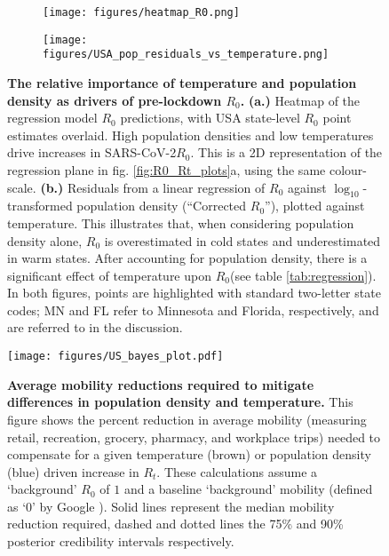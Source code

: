 \documentclass[12pt,english,a4paper]{article}
\newcommand{\virus}{SARS-CoV-2\xspace}
\newcommand{\RO}{$R_0$\xspace}
\begin{document}
\begin{figure}[ht]
\begin{subfigure}{.5\textwidth}
  \centering
  \texttt{[image: figures/heatmap\_R0.png]}  
  \caption{}
\end{subfigure}
\begin{subfigure}{.5\textwidth}
  \centering
  \texttt{[image: figures/USA\_pop\_residuals\_vs\_temperature.png]}  
  \caption{}
\end{subfigure}
  \caption{ {\bf The relative importance of temperature and population density as drivers of pre-lockdown \RO.}
  {\bf (a.)} Heatmap of the regression model \RO predictions, with USA state-level \RO point estimates overlaid. High population densities and low temperatures drive increases in \virus \RO. This is a 2D representation of the regression plane in fig. \ref{fig:R0_Rt_plots}a, using the same colour-scale.
  {\bf (b.)} Residuals from a linear regression of \RO against $\log_{10}$-transformed population density (``Corrected \RO''), plotted against temperature. This illustrates that, when considering population density alone, \RO is overestimated in cold states and underestimated in warm states. After accounting for population density, there is a significant
  effect of temperature upon \RO (see table \ref{tab:regression}). In both figures, points are highlighted with standard two-letter state codes; MN and FL refer to Minnesota and Florida, respectively, and are referred to in the discussion.}
\label{fig:USA_residuals}
\end{figure}



\begin{figure}[ht]
  \centering
  \texttt{[image: figures/US\_bayes\_plot.pdf]}  
\caption{\textbf{Average mobility reductions required to mitigate differences in population density and temperature.} 
This figure shows the percent reduction in average mobility (measuring retail, recreation, grocery, pharmacy, and workplace trips) needed to compensate for a given temperature (brown) or population density (blue) driven increase in $R_t$. These calculations assume a `background' \RO of $1$ and a baseline `background' mobility (defined as `0' by Google \cite{Aktay2020}). Solid lines represent the median mobility reduction required, dashed and dotted lines the 75\% and 90\% posterior credibility intervals respectively. }
\label{fig:bayes}
\end{figure}
\end{document}
